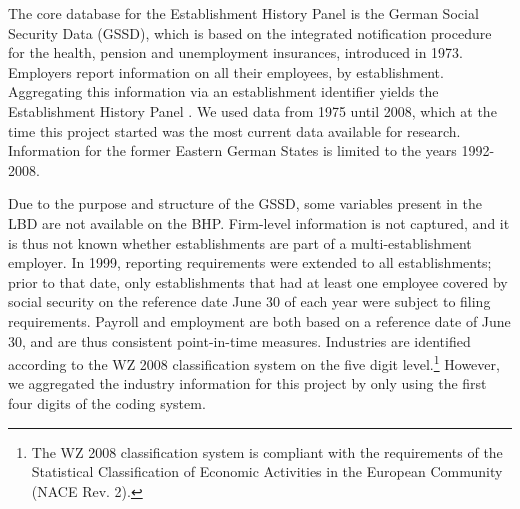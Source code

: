 
The core database for the Establishment History Panel is the German Social Security Data  (GSSD), which is based on the integrated notification procedure for the health, pension and unemployment insurances,   introduced in  1973. Employers report information on all their employees, by establishment. Aggregating this information via an establishment identifier yields the Establishment History Panel \citep[German abbreviation: BHP]{BHP}. We used data from  1975 until 2008, which at the time this project started was the most current data available for research. Information for the former Eastern German States is limited to the years 1992-2008. 

Due to the purpose and structure of the GSSD, some variables present in the \ac{LBD} are not available on the  \ac{BHP}. Firm-level information is not captured, and it is thus not known whether establishments are part of a multi-establishment employer. In 1999, reporting requirements were extended to all establishments; prior to that date, only establishments that  had at least one employee covered by social security on the reference date June 30 of each year were subject to filing requirements. Payroll and employment are both based on a reference date of June 30, and are thus consistent point-in-time measures. 
Industries are identified according to the WZ 2008 classification system \citep{WZ2008} on the five digit level.\footnote{The WZ 2008 classification system is compliant with the requirements of the Statistical Classification of Economic Activities in the European Community (NACE Rev. 2).} However, we aggregated the industry information for this project by only using the first four digits of the coding system.




